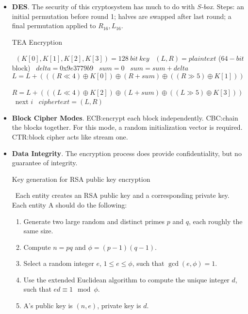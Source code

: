 \documentclass[twocolumn]{article}
\begin{document}
\begin{itemize}
\item \textbf{DES}. The security of this cryptosystem has much to do
  with \emph{S-box}. Steps: an initial permutation before round 1;
  halves are swapped after last round; a final permutation applied to
  $R_{16},L_{16}$. 
  \begin{algorithm}
    \caption{TEA Encryption}
    \label{algo:tea-encryption}
    \begin{algorithmic}
      \STATE~$(K[0],K[1],K[2],K[3])=128~bit~key$
      \STATE~$(L,R)=plaintext$ ($64-bit$ block)
      \STATE~$delta=0$x$9e3779b9$
      \STATE~$sum=0$
      \STATE~$sum=sum+delta$
      \STATE~$L=L+(((R\ll 4)\oplus K[0])\oplus (R+sum)\oplus ((R\gg
      5)\oplus K[1]))$
      \STATE~$R=L+(((L\ll 4)\oplus K[2])\oplus (L+sum)\oplus ((L\gg
      5)\oplus K[3]))$
      \STATE~next $i$
      \ENDFOR
      \STATE~$ciphertext=(L,R)$
    \end{algorithmic}
  \end{algorithm}
\item \textbf{Block Cipher Modes}. ECB:\@ encrypt each block
  independently. CBC:\@ chain the blocks together. For this mode, a
  random initialization vector is required. CTR:\@ block cipher acts
  like stream one.  
\item \textbf{Data Integrity}. The encryption process does provide
  confidentiality, but no guarantee of integrity. 
  \begin{algorithm}
    \begin{algorithmic}
      \caption{Key generation for RSA public key encryption}
      \label{algo:keygen-for-rsa-encrypt}
      \ENSURE~Each entity creates an RSA public key and a
      corresponding private key. Each entity A should do the
      following:
      \begin{enumerate}
      \item Generate two large random and distinct primes $p$ and $q$,
        each roughly the same size.
      \item Compute $n=pq$ and $\phi=(p-1)(q-1)$.
      \item Select a random integer $e$, $1\leq e\leq\phi$, such that
        $\gcd(e,\phi)=1$. 
      \item Use the extended Euclidean algorithm to compute the unique
        integer $d$, such that $ed\equiv 1\mod\phi$.
      \item A's public key is $(n,e)$, private key is $d$.
      \end{enumerate}
    \end{algorithmic}

\end{algorithm}
\end{itemize}
\end{document}
